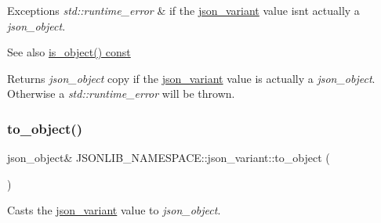 \begin{DoxyExceptions}{Exceptions}
{\em std\+::runtime\+\_\+error} & if the \hyperlink{classJSONLIB__NAMESPACE_1_1json__variant}{json\+\_\+variant} value isn\textquotesingle{}t actually a {\itshape json\+\_\+object}. \\
\hline
\end{DoxyExceptions}
\begin{DoxySeeAlso}{See also}
\hyperlink{classJSONLIB__NAMESPACE_1_1json__variant_a28b4156626bd9f0e344ba1704c7590f3}{is\+\_\+object() const} 
\end{DoxySeeAlso}
\begin{DoxyReturn}{Returns}
{\itshape json\+\_\+object} copy if the \hyperlink{classJSONLIB__NAMESPACE_1_1json__variant}{json\+\_\+variant} value is actually a {\itshape json\+\_\+object}. Otherwise a {\itshape std\+::runtime\+\_\+error} will be thrown. 
\end{DoxyReturn}
\mbox{\label{classJSONLIB__NAMESPACE_1_1json__variant_aacc6999a4b2da8acd01d35cd33f3c5ea}} 
\subsubsection{\texorpdfstring{to\+\_\+object()}{to\_object()}\hspace{0.1cm}{\footnotesize\ttfamily [4/4]}}
{\footnotesize\ttfamily json\+\_\+object\& J\+S\+O\+N\+L\+I\+B\+\_\+\+N\+A\+M\+E\+S\+P\+A\+C\+E\+::json\+\_\+variant\+::to\+\_\+object (\begin{DoxyParamCaption}{ }\end{DoxyParamCaption})}



Casts the \hyperlink{classJSONLIB__NAMESPACE_1_1json__variant}{json\+\_\+variant} value to {\itshape json\+\_\+object}. 


